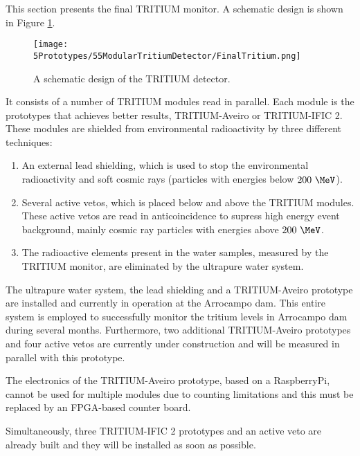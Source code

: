 This section presents the final TRITIUM monitor. A schematic design is shown in Figure \ref{fig:TritiumDetectorSchematicDesign}.

\begin{figure}[h]
\centering
\texttt{[image: 5Prototypes/55ModularTritiumDetector/FinalTritium.png]}
\caption{A schematic design of the TRITIUM detector.\label{fig:TritiumDetectorSchematicDesign}}
\end{figure}

It consists of a number of TRITIUM modules read in parallel. Each module is the prototypes that achieves better results, TRITIUM-Aveiro or TRITIUM-IFIC 2. These modules are shielded from environmental radioactivity by three different techniques:

\begin{enumerate}

\item{} An external lead shielding, which is used to stop the environmental radioactivity and soft cosmic rays (particles with energies below $200~\MeV$).

\item{} Several active vetos, which is placed below and above the TRITIUM modules. These active vetos are read in anticoincidence to supress high energy event background, mainly cosmic ray particles with energies above $200~\MeV$.

\item{} The radioactive elements present in the water samples, measured by the TRITIUM monitor, are eliminated by the ultrapure water system.

\end{enumerate}

The ultrapure water system, the lead shielding and a TRITIUM-Aveiro prototype are installed and currently in operation at the Arrocampo dam. This entire system is employed to successfully monitor the tritium levels in Arrocampo dam during several months. Furthermore, two additional TRITIUM-Aveiro prototypes and four active vetos are currently under construction and will be measured in parallel with this prototype.

The electronics of the TRITIUM-Aveiro prototype, based on a RaspberryPi, cannot be used for multiple modules due to counting limitations and this must be replaced by an FPGA-based counter board.

Simultaneously, three TRITIUM-IFIC 2 prototypes and an active veto are already built and they will be installed as soon as possible.

